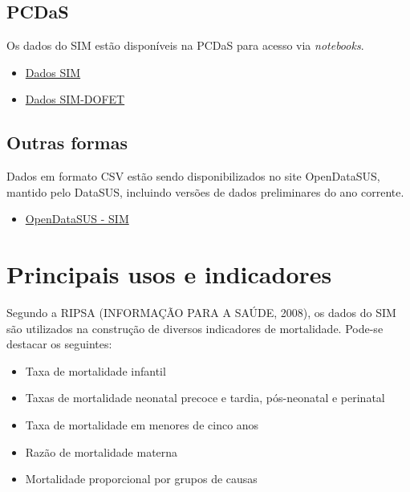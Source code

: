 \documentclass[
  letterpaper,
  DIV=11,
  numbers=noendperiod]{scrreprt}
\providecommand{\tightlist}{%
  \setlength{\itemsep}{0pt}\setlength{\parskip}{0pt}}\usepackage{longtable,booktabs,array}
\begin{document}
\subsection{PCDaS}\label{pcdas}

Os dados do SIM estão disponíveis na PCDaS para acesso via
\emph{notebooks}.

\begin{itemize}
\tightlist
\item
  \href{https://pcdas.icict.fiocruz.br/conjunto-de-dados/sistema-de-informacoes-de-mortalidade-sim/}{Dados
  SIM}
\item
  \href{https://pcdas.icict.fiocruz.br/conjunto-de-dados/sistema-de-informacao-sobre-mortalidade-declaracao-de-obitos-fetais-sim-dofet/}{Dados
  SIM-DOFET}
\end{itemize}

\subsection{Outras formas}\label{outras-formas}

Dados em formato CSV estão sendo disponibilizados no site OpenDataSUS,
mantido pelo DataSUS, incluindo versões de dados preliminares do ano
corrente.

\begin{itemize}
\tightlist
\item
  \href{https://opendatasus.saude.gov.br/dataset/sim}{OpenDataSUS - SIM}
\end{itemize}

\section{Principais usos e
indicadores}\label{principais-usos-e-indicadores}

Segundo a RIPSA (INFORMAÇÃO PARA A SAÚDE, 2008), os dados do SIM são
utilizados na construção de diversos indicadores de mortalidade. Pode-se
destacar os seguintes:

\begin{itemize}
\tightlist
\item
  Taxa de mortalidade infantil
\item
  Taxas de mortalidade neonatal precoce e tardia, pós-neonatal e
  perinatal
\item
  Taxa de mortalidade em menores de cinco anos
\item
  Razão de mortalidade materna
\item
  Mortalidade proporcional por grupos de causas
\end{itemize}
\end{document}
